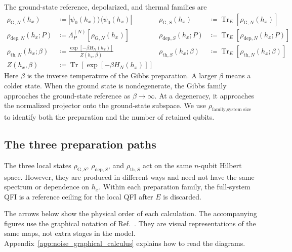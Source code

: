 \begin{definition}
    The ground-state reference, depolarized, and thermal families are
    \begin{align}
        \rho_{\mathrm{G},N}(h_x)
         & \coloneqq |\psi_0(h_x)\rangle\langle\psi_0(h_x)|               &
        \rho_{\mathrm{G},S}(h_x)
         & \coloneqq \operatorname{Tr}_E[\rho_{\mathrm{G},N}(h_x)]          \\
        \rho_{\mathrm{dep},N}(h_x;P)
         & \coloneqq \Lambda^{(N)}_P[\rho_{\mathrm{G},N}(h_x)]            &
        \rho_{\mathrm{dep},S}(h_x;P)
         & \coloneqq \operatorname{Tr}_E[\rho_{\mathrm{dep},N}(h_x;P)]      \\
        \rho_{\mathrm{th},N}(h_x;\beta)
         & \coloneqq \frac{\exp[-\beta H_N(h_x)]}{Z(h_x,\beta)}           &
        \rho_{\mathrm{th},S}(h_x;\beta)
         & \coloneqq \operatorname{Tr}_E[\rho_{\mathrm{th},N}(h_x;\beta)]   \\
        Z(h_x,\beta)
         & \coloneqq \operatorname{Tr}[\exp[-\beta H_N(h_x)]]
        \label{eq:noise_state_families}
    \end{align}
    Here $\beta$ is the inverse temperature of the Gibbs preparation.  A larger $\beta$ means a colder state.  When the ground state is nondegenerate, the Gibbs family approaches the ground-state reference as $\beta\to\infty$.  At a degeneracy, it approaches the normalized projector onto the ground-state subspace.  We use $\rho_{\text{family},\text{system size}}$ to identify both the preparation and the number of retained qubits.
\end{definition}


\subsection{The three preparation paths}

The three local states $\rho_{\mathrm{G},S}$, $\rho_{\mathrm{dep},S}$, and $\rho_{\mathrm{th},S}$ act on the same $n$-qubit Hilbert space.  However, they are produced in different ways and need not have the same spectrum or dependence on $h_x$.  Within each preparation family, the full-system QFI is a reference ceiling for the local QFI after $E$ is discarded.

The arrows below show the physical order of each calculation.  The accompanying figures use the graphical notation of Ref.~\cite{wood2015graphical}.  They are visual representations of the same maps, not extra stages in the model.  Appendix~\ref{app:noise_graphical_calculus} explains how to read the diagrams.

